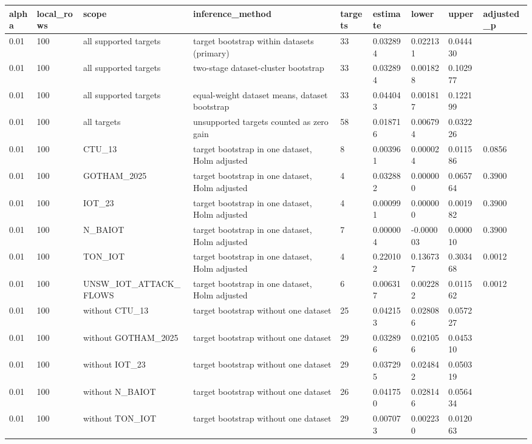 \begin{tabular}{lllllllll}
\toprule
alpha & local\_rows & scope & inference\_method & targets & estimate & lower & upper & adjusted\_p \\
\midrule
0.01 & 100 & all supported targets & target bootstrap within datasets (primary) & 33 & 0.032894 & 0.022131 & 0.044430 &  \\
0.01 & 100 & all supported targets & two-stage dataset-cluster bootstrap & 33 & 0.032894 & 0.001828 & 0.102977 &  \\
0.01 & 100 & all supported targets & equal-weight dataset means, dataset bootstrap & 33 & 0.044043 & 0.001817 & 0.122199 &  \\
0.01 & 100 & all targets & unsupported targets counted as zero gain & 58 & 0.018716 & 0.006794 & 0.032226 &  \\
0.01 & 100 & CTU\_13 & target bootstrap in one dataset, Holm adjusted & 8 & 0.003961 & 0.000024 & 0.011586 & 0.0856 \\
0.01 & 100 & GOTHAM\_2025 & target bootstrap in one dataset, Holm adjusted & 4 & 0.032882 & 0.000000 & 0.065764 & 0.3900 \\
0.01 & 100 & IOT\_23 & target bootstrap in one dataset, Holm adjusted & 4 & 0.000991 & 0.000000 & 0.001982 & 0.3900 \\
0.01 & 100 & N\_BAIOT & target bootstrap in one dataset, Holm adjusted & 7 & 0.000004 & -0.000003 & 0.000010 & 0.3900 \\
0.01 & 100 & TON\_IOT & target bootstrap in one dataset, Holm adjusted & 4 & 0.220102 & 0.136737 & 0.303468 & 0.0012 \\
0.01 & 100 & UNSW\_IOT\_ATTACK\_FLOWS & target bootstrap in one dataset, Holm adjusted & 6 & 0.006317 & 0.002282 & 0.011562 & 0.0012 \\
0.01 & 100 & without CTU\_13 & target bootstrap without one dataset & 25 & 0.042153 & 0.028086 & 0.057227 &  \\
0.01 & 100 & without GOTHAM\_2025 & target bootstrap without one dataset & 29 & 0.032896 & 0.021056 & 0.045310 &  \\
0.01 & 100 & without IOT\_23 & target bootstrap without one dataset & 29 & 0.037295 & 0.024842 & 0.050319 &  \\
0.01 & 100 & without N\_BAIOT & target bootstrap without one dataset & 26 & 0.041750 & 0.028146 & 0.056434 &  \\
0.01 & 100 & without TON\_IOT & target bootstrap without one dataset & 29 & 0.007073 & 0.002230 & 0.012063 &  \\

\end{tabular}

